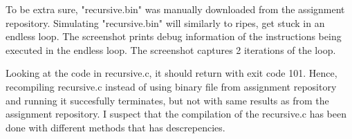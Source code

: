 \hspace{2em}

To be extra sure, "recursive.bin" was manually downloaded from the assignment repository.
Simulating "recursive.bin" will similarly to ripes, get stuck in an endless loop. 
The screenshot prints debug information of the instructions being executed in the endless loop.
The screenshot captures 2 iterations of the loop.

Looking at the code in recursive.c, it should return with exit code 101. 
Hence, recompiling recursive.c instead of using binary file from assignment repository and running it succesfully terminates, but not with same results as from the assignment repository.
I suspect that the compilation of the recursive.c has been done with different methods that has descrepencies.